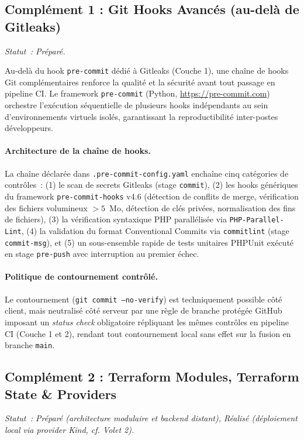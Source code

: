 \subsection{Complément 1 : Git Hooks Avancés (au-delà de Gitleaks)}
\label{subsec:comp_git_hooks}
\textit{Statut~: Préparé.}

Au-delà du hook \texttt{pre-commit} dédié à Gitleaks (Couche 1), une chaîne de hooks Git complémentaires renforce la qualité et la sécurité avant tout passage en pipeline CI. Le framework \texttt{pre-commit} (Python, \url{https://pre-commit.com}) orchestre l'exécution séquentielle de plusieurs hooks indépendants au sein d'environnements virtuels isolés, garantissant la reproductibilité inter-postes développeurs.

\paragraph{Architecture de la chaîne de hooks.}
La chaîne déclarée dans \texttt{.pre-commit-config.yaml} enchaîne cinq catégories de contrôles~: (1) le scan de secrets Gitleaks (stage \texttt{commit}), (2) les hooks génériques du framework \texttt{pre-commit-hooks} v4.6 (détection de conflits de merge, vérification des fichiers volumineux $>5$~Mo, détection de clés privées, normalisation des fins de fichiers), (3) la vérification syntaxique PHP parallélisée via \texttt{PHP-Parallel-Lint}, (4) la validation du format Conventional Commits via \texttt{commitlint} (stage \texttt{commit-msg}), et (5) un sous-ensemble rapide de tests unitaires PHPUnit exécuté en stage \texttt{pre-push} avec interruption au premier échec.

\paragraph{Politique de contournement contrôlé.}
Le contournement (\texttt{git commit --no-verify}) est techniquement possible côté client, mais neutralisé côté serveur par une règle de branche protégée GitHub imposant un \textit{status check} obligatoire répliquant les mêmes contrôles en pipeline CI (Couche 1 et 2), rendant tout contournement local sans effet sur la fusion en branche \texttt{main}.


\subsection{Complément 2 : Terraform Modules, Terraform State \& Providers}
\label{subsec:comp_terraform_modules}
\textit{Statut~: Préparé (architecture modulaire et backend distant), Réalisé (déploiement local via provider Kind, cf. Volet 2).}

